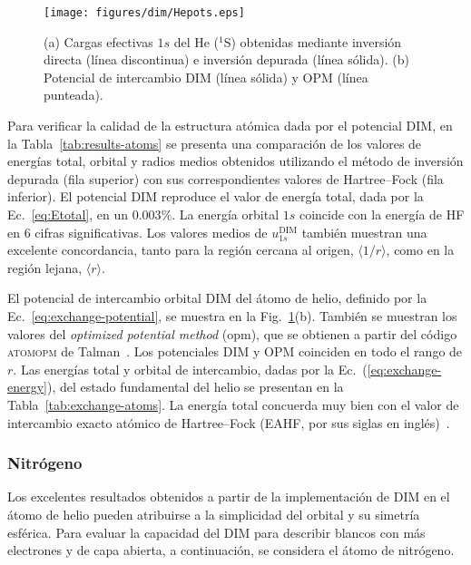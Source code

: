 \begin{figure}[t]
\centering
\texttt{[image: figures/dim/Hepots.eps]}
\caption[Cargas efectivas y potencial de intercambio DIM de He.]
{(a) Cargas efectivas $1s$ del He ($^1$S) obtenidas mediante inversión 
directa (línea discontinua) e inversión depurada (línea sólida). 
(b) Potencial de intercambio DIM (línea sólida) y OPM (línea punteada).}
\label{fig:Hepots}
\end{figure}

Para verificar la calidad de la estructura atómica dada por el potencial 
DIM, en la Tabla~\ref{tab:results-atoms} se presenta una comparación 
de los valores de energías total, orbital y radios medios obtenidos 
utilizando el método de inversión depurada (fila superior) con sus 
correspondientes valores de Hartree--Fock (fila inferior). El potencial 
DIM reproduce el valor de energía total, dada por la 
Ec.~\ref{eq:Etotal}, en un $0.003\%$. La energía orbital $1s$ coincide 
con la energía de HF en 6 cifras significativas. Los valores medios de 
$u_{1s}^{\mathrm{DIM}}$ también muestran una excelente concordancia, 
tanto para la región cercana al origen, $\langle 1/r\rangle$, como en la 
región lejana, $\langle r\rangle$.

El potencial de intercambio orbital DIM del átomo de helio, definido por 
la Ec.~\ref{eq:exchange-potential}, se muestra en la 
Fig.~\ref{fig:Hepots}(b). También se muestran los valores del 
\textit{optimized potential method} (\acs{opm}), que se obtienen a 
partir del código \textsc{atomopm} de Talman~\cite{Talman:76,Talman:89}. 
Los potenciales DIM y OPM coinciden en todo el rango de $r$. Las 
energías total y orbital de intercambio, dadas por la 
Ec.~(\ref{eq:exchange-energy}), del estado fundamental del helio se 
presentan en la Tabla~\ref{tab:exchange-atoms}. La energía total 
concuerda muy bien con el valor de intercambio exacto atómico de 
Hartree--Fock (EAHF, por sus siglas en inglés)~\cite{Becke:88}.

\subsubsection*{Nitrógeno}

Los excelentes resultados obtenidos a partir de la implementación de DIM 
en el átomo de helio pueden atribuirse a la simplicidad del orbital y su 
simetría esférica. Para evaluar la capacidad del DIM para describir 
blancos con más electrones y de capa abierta, a continuación, se 
considera el átomo de nitrógeno. 

